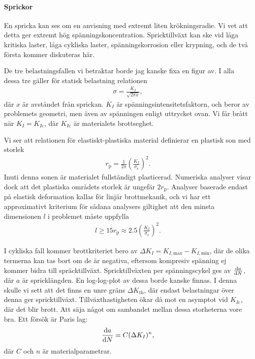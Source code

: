 \paragraph{Sprickor}
En spricka kan ses om en anvisning med extremt liten krökningsradie. Vi vet att detta ger extremt hög spänningskoncentration. Spricktillväxt kan ske vid låga kritiska laster, låga cykliska laster, spänningskorrosion eller krypning, och de två första kommer diskuteras här.

De tre belastningsfallen vi betraktar borde jag kanske fixa en figur av. I alla dessa tre gäller för statisk belastning relationen
\begin{align*}
 	\sigma = \frac{K_{I}}{\sqrt{2\pi x}},
\end{align*}
där $x$ är avståndet från sprickan. $K_{I}$ är spänningsintensitetsfaktorn, och beror av problemets geometri, men även av spänningen enligt uttrycket ovan. Vi får brått när $K_{I} = K_{I\text{c}}$, där $K_{I\text{c}}$ är materialets brottseghet.

Vi ser att relationen för elastiskt-plastiska material definierar en plastisk son med storlek
\begin{align*}
	r_{\text{p}} = \frac{1}{2\pi}\left(\frac{K_{I}}{\sigma_{\text{s}}}\right)^{2}.
\end{align*}
Inuti denna sonen är materialet fullständigt plasticerad. Numeriska analyser visar dock att det plastiska områdets storlek är ungefär $2r_{\text{p}}$. Analyser baserade endast på elastisk deformation kallas för linjär brottmekanik, och vi har ett approximativt kriterium för sådana analysers giltighet att den minsta dimensionen $l$ i problemet måste uppfylla
\begin{align*}
	l \geq 15r_{\text{p}} \approx 2.5\left(\frac{K_{I}}{\sigma_{\text{s}}}\right)^{2}.
\end{align*}

I cykliska fall kommer brottkriteriet bero av $\Delta K_{I} = K_{I,\text{max}} - K_{I,\text{min}}$, där de olika termerna kan tas bort om de är negativa, eftersom kompresiv spänning ej kommer bidra till spräcktillväxt. Spricktillväxten per spänningscykel ges av $\dv{a}{N}$, där $a$ är spricklängden. En log-log-plot av dessa borde kanske finnas. I denna skulle vi sett att det finns en unre gräns $\Delta K_{\text{th}}$, där endast belastningar över denna ger spricktillväxt. Tillväxthastigheten ökar då mot en asymptot vid $K_{I\text{c}}$, där det blir brott. Att säja något om sambandet mellan dessa storheterna vore bra. Ett försök är Paris lag:
\begin{align*}
	\dv{a}{N} = C(\Delta K_{I})^{n},
\end{align*}
där $C$ och $n$ är materialparametrar.